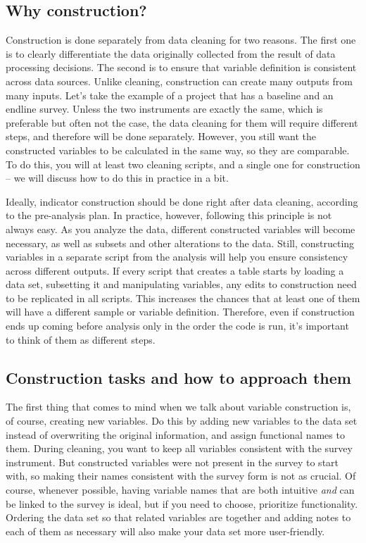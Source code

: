 \subsection{Why construction?}

Construction is done separately from data cleaning for two reasons. 
The first one is to clearly differentiate the data originally collected from the result of data processing decisions.
The second is to ensure that variable definition is consistent across data sources. 
Unlike cleaning, construction can create many outputs from many inputs. 
Let's take the example of a project that has a baseline and an endline survey. 
Unless the two instruments are exactly the same, which is preferable but often not the case,  the data cleaning for them will require different steps, and therefore will be done separately. 
However, you still want the constructed variables to be calculated in the same way, so they are comparable.
To do this, you will at least two cleaning scripts, and a single one for construction --
we will discuss how to do this in practice in a bit.

Ideally, indicator construction should be done right after data cleaning, according to the pre-analysis plan. 
In practice, however, following this principle is not always easy.
As you analyze the data, different constructed variables will become necessary, as well as subsets and other alterations to the data.
Still, constructing variables in a separate script from the analysis will help you ensure consistency across different outputs. 
If every script that creates a table starts by loading a data set, subsetting it and manipulating variables, any edits to construction need to be replicated in all scripts. 
This increases the chances that at least one of them will have a different sample or variable definition.
Therefore, even if construction ends up coming before analysis only in the order the code is run,
it's important to think of them as different steps.

\subsection{Construction tasks and how to approach them}

The first thing that comes to mind when we talk about variable construction is, of course, creating new variables.
Do this by adding new variables to the data set instead of overwriting the original information, and assign functional names to them.
During cleaning, you want to keep all variables consistent with the survey instrument.
But constructed variables were not present in the survey to start with,
so making their names consistent with the survey form is not as crucial.
Of course, whenever possible, having variable names that are both intuitive \textit{and} can be linked to the survey is ideal, but if you need to choose, prioritize functionality.
Ordering the data set so that related variables are together and adding notes to each of them as necessary will also make your data set more user-friendly.

